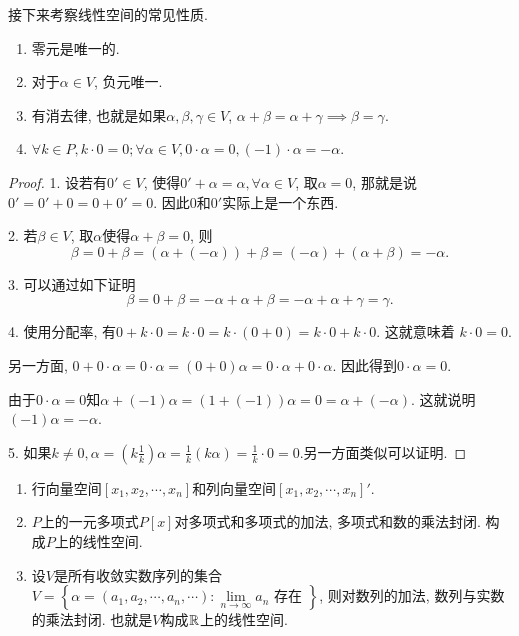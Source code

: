 \documentclass{ctexart}
\begin{document}
接下来考察线性空间的常见性质. 

\begin{prop}
    \begin{enumerate} 对于这个定义, 立即有以下的性质. 
        \item 零元是唯一的. 
\item 对于$\alpha\in V$, 负元唯一. 
\item 有消去律, 也就是如果$\alpha, \beta, \gamma\in V$, $\alpha+\beta=\alpha+\gamma\implies \beta=\gamma$.
\item $\forall k\in P, k\cdot 0=0; \forall \alpha\in V, 0\cdot \alpha=0, (-1)\cdot \alpha=-\alpha$. 
    \end{enumerate}
    \end{prop}
\begin{proof}
    1. 设若有$0' \in V$, 使得$0'+\alpha=\alpha, \forall \alpha\in V$, 取$\alpha=0$, 那就是说$0'=0'+0=0+0'=0$. 因此$0$和$0'$实际上是一个东西. 

    2. 若$\beta\in V$, 取$\alpha$使得$\alpha+\beta=0$, 则
    \[
        \beta=0+\beta=(\alpha+(-\alpha))+\beta=(-\alpha)+(\alpha+\beta)=-\alpha.
    \]

    3. 可以通过如下证明
    \[
        \beta=0+\beta=-\alpha+\alpha+\beta=-\alpha+\alpha+\gamma=\gamma .
    \]

    4. 使用分配率, 有$0+k \cdot 0=k \cdot 0=k \cdot(0+0)=k \cdot 0+k \cdot 0$. 这就意味着
    $k \cdot 0=0$. 

    另一方面, $0+0 \cdot \alpha=0 \cdot \alpha=(0+0) \alpha=0 \cdot \alpha+0 \cdot \alpha$. 因此得到$0 \cdot \alpha=0$. 

    由于$0\cdot \alpha=0$知$\alpha+(-1) \alpha=(1+(-1)) \alpha=0=\alpha+(-\alpha)$. 这就说明$(-1)\alpha=-\alpha$. 


    5. 如果$k\neq 0, \alpha=(k \frac 1k)\alpha=\frac 1k (k\alpha)=\frac 1k \cdot 0=0$.另一方面类似可以证明.
    
\end{proof}

\begin{example}
    \begin{enumerate}
        \item 行向量空间$[x_1, x_2, \cdots, x_n]$和列向量空间$[x_1, x_2, \cdots, x_n]'$. 
        \item $P$上的一元多项式$P[x]$对多项式和多项式的加法, 多项式和数的乘法封闭. 构成$P$上的线性空间. 
        \item 设$V$是所有收敛实数序列的集合 $V=\left\{\alpha=\left(a_1, a_2, \cdots, a_n, \cdots\right):  \underset{n \rightarrow \infty}\lim a_n \text { 存在 }\right\}$, 则对数列的加法, 数列与实数的乘法封闭. 也就是$V$构成$\mathbb R$上的线性空间. 
    \end{enumerate}
    
\end{example}
\end{document}
